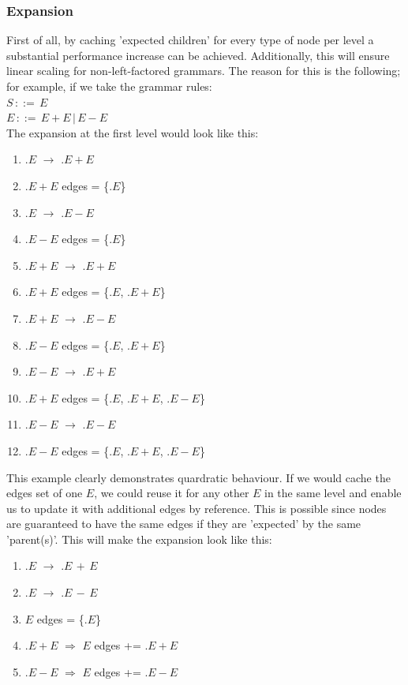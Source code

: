 \documentclass[a4paper,10pt]{article}
\begin{document}
\subsubsection{Expansion}
First of all, by caching 'expected children' for every type of node per level a substantial performance increase can be achieved. Additionally, this will ensure linear scaling for non-left-factored grammars. The reason for this is the following; for example, if we take the grammar rules:\\
$S\,::=\,E$\\
$E\,::=\,E + E\,|\,E - E$\\
The expansion at the first level would look like this:
\begin{enumerate}
 \setlength{\itemsep}{0pt}
 \setlength{\parskip}{0pt}
 \setlength{\parsep}{0pt}
 
 \item $.E$ $\rightarrow$ $.E+E$
 \item $.E+E$ edges = \{$.E$\}
 \item $.E$ $\rightarrow$ $.E-E$
 \item $.E-E$ edges = \{$.E$\}
 \item $.E+E$ $\rightarrow$ $.E+E$
 \item $.E+E$ edges = \{$.E$, $.E+E$\}
 \item $.E+E$ $\rightarrow$ $.E-E$
 \item $.E-E$ edges = \{$.E$, $.E+E$\}
 \item $.E-E$ $\rightarrow$ $.E+E$
 \item $.E+E$ edges = \{$.E$, $.E+E$, $.E-E$\}
 \item $.E-E$ $\rightarrow$ $.E-E$
 \item $.E-E$ edges = \{$.E$, $.E+E$, $.E-E$\}
\end{enumerate}
This example clearly demonstrates quardratic behaviour. If we would cache the edges set of one $E$, we could reuse it for any other $E$ in the same level and enable us to update it with additional edges by reference. This is possible since nodes are guaranteed to have the same edges if they are 'expected' by the same 'parent(s)'. This will make the expansion look like this:
\begin{enumerate}
 \setlength{\itemsep}{0pt}
 \setlength{\parskip}{0pt}
 \setlength{\parsep}{0pt}
 
 \item $.E$ $\rightarrow$ $.E\,+\,E$
 \item $.E$ $\rightarrow$ $.E\,-\,E$
 \item $E$ edges = \{$.E$\}
 \item $.E+E$ $\Rightarrow$ $E$ edges += $.E+E$
 \item $.E-E$ $\Rightarrow$ $E$ edges += $.E-E$
\end{enumerate}
\end{document}
